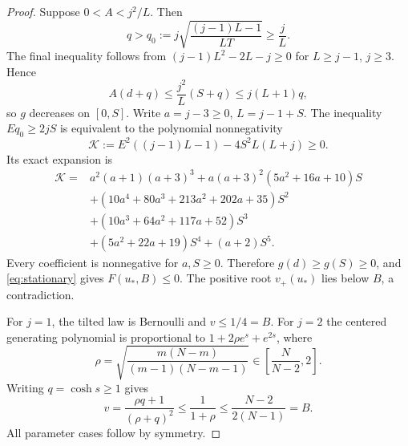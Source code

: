 \documentclass[11pt,a4paper]{article}
\begin{document}
\begin{proof}
Suppose $0<A<j^2/L$. Then
\[
 q>q_0:=j\sqrt{\frac{(j-1)L-1}{LT}}\ge\frac jL.
\]
The final inequality follows from $(j-1)L^2-2L-j\ge0$ for $L\ge j-1$, $j\ge3$. Hence
\[
 A(d+q)\le\frac{j^2}{L}(S+q)\le j(L+1)q,
\]
so $g$ decreases on $[0,S]$. Write $a=j-3\ge0$, $L=j-1+S$. The inequality $Eq_0\ge2jS$ is equivalent to the polynomial nonnegativity
\begin{equation}\label{eq:K}
 \mathcal K:=E^2((j-1)L-1)-4S^2L(L+j)\ge0.
\end{equation}
Its exact expansion is
\begin{align*}
\mathcal K={}&a^2(a+1)(a+3)^3
+a(a+3)^2(5a^2+16a+10)S\\
&+(10a^4+80a^3+213a^2+202a+35)S^2\\
&+(10a^3+64a^2+117a+52)S^3\\
&+(5a^2+22a+19)S^4+(a+2)S^5.
\end{align*}
Every coefficient is nonnegative for $a,S\ge0$. Therefore
$g(d)\ge g(S)\ge0$, and \eqref{eq:stationary} gives $F(u_*,B)\le0$. The positive root $v_+(u_*)$ lies below $B$, a contradiction.

For $j=1$, the tilted law is Bernoulli and $v\le1/4=B$. For $j=2$ the centered generating polynomial is proportional to $1+2\rho e^s+e^{2s}$, where
\[
 \rho=\sqrt{\frac{m(N-m)}{(m-1)(N-m-1)}}\in\left[\frac{N}{N-2},2\right].
\]
Writing $q=\cosh s\ge1$ gives
\[
 v=\frac{\rho q+1}{(\rho+q)^2}\le\frac1{1+\rho}\le\frac{N-2}{2(N-1)}=B.
\]
All parameter cases follow by symmetry.
\end{proof}
\end{document}
